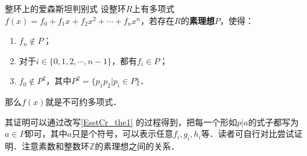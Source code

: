 \begin{theorem}{整环上的爱森斯坦判别式}
设整环$R$上有多项式$f(x)=f_0+f_1x+f_2x^2+\cdots+f_nx^n$，若存在$R$的\textbf{素理想}$P$，使得：
\begin{enumerate}
\item $f_n\not\in P$；
\item 对于$i\in\{0, 1, 2, \cdots, n-1\}$，都有$f_i\in P$；
\item $f_0\not\in P^2$，其中$P^2=\{p_1p_2|p_i\in P\}$．
\end{enumerate}
那么$f(x)$就是不可约多项式．
\end{theorem}

其证明可以通过改写\autoref{EsstCr_the1} 的过程得到，把每一个形如$p|a$的式子都写为$a\in P$即可，其中$a$只是个符号，可以表示任意$f_i, g_i, h_i$等．读者可自行对比尝试证明．注意素数和整数环$\mathbb{Z}$的素理想之间的关系．





